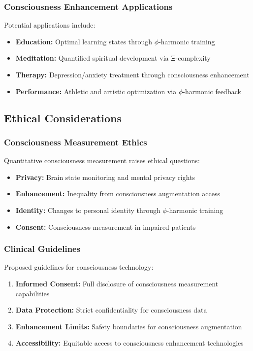 \subsubsection{Consciousness Enhancement Applications}

Potential applications include:
\begin{itemize}
\item \textbf{Education:} Optimal learning states through $\phi$-harmonic training
\item \textbf{Meditation:} Quantified spiritual development via Ξ-complexity
\item \textbf{Therapy:} Depression/anxiety treatment through consciousness enhancement
\item \textbf{Performance:} Athletic and artistic optimization via $\phi$-harmonic feedback
\end{itemize}

\subsection{Ethical Considerations}

\subsubsection{Consciousness Measurement Ethics}

Quantitative consciousness measurement raises ethical questions:
\begin{itemize}
\item \textbf{Privacy:} Brain state monitoring and mental privacy rights
\item \textbf{Enhancement:} Inequality from consciousness augmentation access
\item \textbf{Identity:} Changes to personal identity through $\phi$-harmonic training
\item \textbf{Consent:} Consciousness measurement in impaired patients
\end{itemize}

\subsubsection{Clinical Guidelines}

Proposed guidelines for consciousness technology:
\begin{enumerate}
\item \textbf{Informed Consent:} Full disclosure of consciousness measurement capabilities
\item \textbf{Data Protection:} Strict confidentiality for consciousness data
\item \textbf{Enhancement Limits:} Safety boundaries for consciousness augmentation
\item \textbf{Accessibility:} Equitable access to consciousness enhancement technologies
\end{enumerate}

